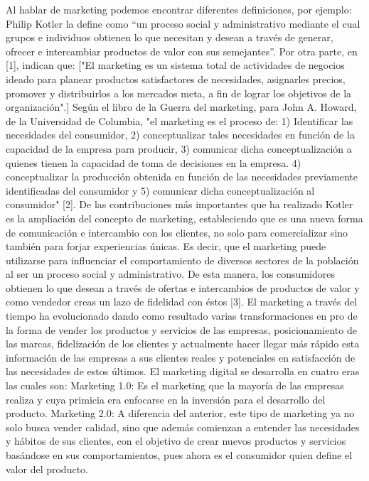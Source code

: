 \documentclass[12pt]{difu100cia} %
\begin{document}
Al hablar de marketing podemos encontrar diferentes definiciones, por ejemplo: Philip Kotler la define como {“un proceso social y administrativo mediante el cual grupos e individuos obtienen lo que necesitan y desean a través de generar, ofrecer e intercambiar productos de valor con sus semejantes”.}
Por otra parte, en [1], indican que: ["El marketing es un sistema total de actividades de negocios ideado para planear productos satisfactores de necesidades, asignarles precios, promover y distribuirlos a los mercados meta, a fin de lograr los objetivos de la organización".]
Según el libro de la Guerra del marketing, para John A. Howard, de la Universidad de Columbia, {"el marketing es el proceso de: 1) Identificar las necesidades del consumidor, 2) conceptualizar tales necesidades en función de la capacidad de la empresa para producir, 3) comunicar dicha conceptualización a quienes tienen la capacidad de toma de decisiones en la empresa. 4) conceptualizar la producción obtenida en función de las necesidades previamente identificadas del consumidor y 5) comunicar dicha conceptualización al consumidor" [2].}
De las contribuciones más importantes que ha realizado Kotler es la ampliación del concepto de marketing, estableciendo que es una nueva forma de comunicación e intercambio con los clientes, no solo para comercializar sino también para forjar experiencias únicas. Es decir, que el marketing puede utilizarse para influenciar el comportamiento de diversos sectores de la población al ser un proceso social y administrativo. De esta manera, los consumidores obtienen lo que desean a través de ofertas e intercambios de productos de valor y como vendedor creas un lazo de fidelidad con éstos [3].  
El marketing a través del tiempo ha evolucionado dando como resultado varias transformaciones en pro de la forma de vender los productos y servicios de las empresas, posicionamiento de las marcas, fidelización de los clientes y actualmente hacer llegar más rápido esta información de las empresas a sus clientes reales y potenciales en satisfacción de las necesidades de estos últimos.
El marketing digital se desarrolla en cuatro eras las cuales son:
Marketing 1.0: Es el marketing que la mayoría de las empresas realiza y cuya primicia era enfocarse en la inversión para el desarrollo del producto. 
Marketing 2.0: A diferencia del anterior, este tipo de marketing ya no solo busca vender calidad, sino que además comienzan a entender las necesidades y hábitos de sus clientes, con el objetivo de crear nuevos productos y servicios basándose en sus comportamientos, pues ahora es el consumidor quien define el valor del producto. 
\end{document}
